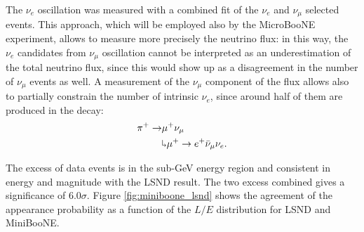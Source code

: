 The $\nu_{e}$ oscillation was measured with a combined fit of the $\nu_{e}$ and $\nu_{\mu}$ selected events. This approach, which will be employed also by the MicroBooNE experiment, allows to measure more precisely the neutrino flux: in this way, the $\nu_e$ candidates from $\nu_{\mu}$ oscillation cannot be interpreted as an underestimation of the total neutrino flux, since this would show up as a disagreement in the number of $\nu_{\mu}$ events as well. A measurement of the $\nu_{\mu}$ component of the flux allows also to partially constrain the number of intrinsic $\nu_e$, since around half of them are produced in the decay:
\begin{align}
    \pi^+ \rightarrow & \mu^+\nu_{\mu}\\
    & \rotatebox[origin=c]{180}{$\Lsh$}	 \mu^{+} \rightarrow e^+\bar{\nu}_{\mu}\nu_{e}.
\end{align}

The excess of data events is in the sub-GeV energy region and consistent in energy and magnitude with the LSND result. The two excess combined gives a significance of $6.0\sigma$. Figure \ref{fig:miniboone_lsnd} shows the agreement of the appearance probability as a function of the $L/E$ distribution for LSND and MiniBooNE. 

